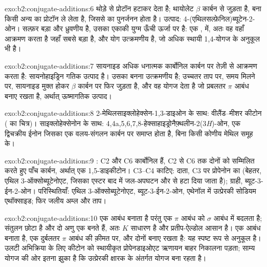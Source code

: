 \begin{solution}{exo:b2:conjugate-additions:6}
 थोड़े  से प्रोटॉन हटाकर  देता है; थायोलेट $\beta$ कार्बन से जुड़ता है,
बना  किसी अन्य  का प्रोटॉन ले लेता है, जिससे  का पुनर्जनन होता है। उत्पाद:
4-(एथिलसल्फ़ेनिल)ब्यूटेन-2-ओन। सल्फ़र बड़ा और ध्रुवणीय है, उसका एकाकी युग्म ऊँची ऊर्जा पर है: एक ,  में, अतः वह वहाँ आक्रमण करता है जहाँ  सबसे बड़ा है, और योग
उत्क्रमणीय है, जो अधिक स्थायी 1,4-योगज के अनुकूल भी है।
\end{solution}

\begin{solution}{exo:b2:conjugate-additions:7}
सायनाइड अधिक धनात्मक कार्बोनिल कार्बन पर तेज़ी से आक्रमण करता है: सायनोहाइड्रिन गतिक उत्पाद है। उसका
बनना उत्क्रमणीय है; उच्चतर ताप पर, समय मिलने पर, सायनाइड मुक्त होकर
$\beta$ कार्बन पर फिर जुड़ता है, और वह योगज देता है जो प्रबलतर  $\pi$ आबंध बनाए रखता है, अर्थात् ऊष्मागतिक उत्पाद।
\end{solution}

\begin{solution}{exo:b2:conjugate-additions:8}
2-मेथिलसाइक्लोहेक्सेन-1,3-डाइओन के साथ: वीलैंड--मीशर कीटोन ( का चित्र)।
साइक्लोहेक्सेनोन के साथ: 4,4a,5,6,7,8-हेक्साहाइड्रोनैफ़्थलीन-2(3\textit{H})-ओन, एक द्विचक्रीय ईनोन जिसका
 एक वलय-संगलन कार्बन पर समाप्त होता है, बिना किसी कोणीय मेथिल समूह के।
\end{solution}

\begin{solution}{exo:b2:conjugate-additions:9}
: C2 और C6 कार्बोनिल हैं, C2 से C6 तक दोनों को सम्मिलित करते हुए पाँच कार्बन,
अर्थात् एक 1,5-डाइकीटोन। C3--C4 काटिए: दाता, C3 पर प्रोपेनोन का  (बेहतर, एथिल 3-ऑक्सोब्यूटेनोएट, जिसका
एस्टर बाद में जल-अपघटन और  से हटा दिया जाता है); ग्राही, ब्यूट-3-ईन-2-ओन। परिस्थितियाँ:
एथिल 3-ऑक्सोब्यूटेनोएट, ब्यूट-3-ईन-2-ओन, एथेनॉल में उत्प्रेरकी सोडियम एथॉक्साइड; फिर जलीय अम्ल और
ताप।
\end{solution}

\begin{solution}{exo:b2:conjugate-additions:10}
 एक  आबंध बनाता है परंतु एक  $\pi$ आबंध को  $\sigma$ आबंध में बदलता है;
संतुलन छोटा है और दो अणु एक बनते हैं, अतः $K$ साधारण है और प्रतीप-ऐल्डोल आसान है।
 एक  आबंध बनाता है, एक दुर्बलतर  $\pi$ आबंध की क़ीमत पर, और दोनों
 बनाए रखता है: यह स्पष्ट रूप से अनुकूल है। उलटी अभिक्रिया के लिए कीटोन  को स्थायीकृत प्रोपेनडाइओएट ऋणायन बाहर निकालना पड़ता;
साम्य योगज की ओर इतना झुका है कि उत्प्रेरकी क्षारक के अंतर्गत योगज बना रहता है।
\end{solution}

